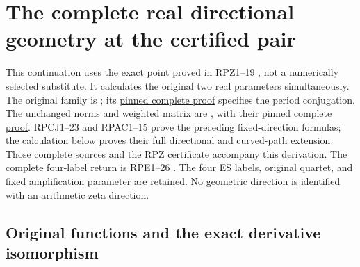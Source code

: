 \section{The complete real directional geometry at the certified pair}
\label{sec:real-pair-directional}

This continuation uses the exact point proved in RPZ1--19
\cite{RPZ005}, not a
numerically selected substitute.  It calculates the original two real
parameters simultaneously.  The original family is
\cite[PCL1--10]{PCLOriginal}; its
\href{https://github.com/KokunoYumeto/zeta-function-research-reader/blob/487253b5b01851da5b9b98af4e146fecf1fab902/workbenches/splitzero-tandem/continuations/20260919-native-conductor-coprimality/providers/PCL_COMPLETE.tex#L19}{pinned complete proof}
specifies the period conjugation.  The unchanged norms and weighted
matrix are \cite[WCF1--6]{WCF}, with their
\href{https://github.com/KokunoYumeto/zeta-function-research-reader/blob/5992ad50c0f2a06921f1fcaded7b4e38097c0739/workbenches/splitzero-tandem/continuations/20260920-original-kernel-mixed-determinants/providers/WEIGHTED_CONDUCTOR_FORWARD.tex#L28}{pinned complete proof}.
RPCJ1--23 and RPAC1--15 \cite{RPCJ005,RPAC005} prove the preceding fixed-direction formulas;
the calculation below proves their full directional and curved-path
extension.  Those complete sources and the RPZ certificate accompany
this derivation.  The complete four-label return is RPE1--26 \cite{RPE005}.
The four ES labels, original quartet, and fixed
amplification parameter are retained.  No geometric direction is
identified with an arithmetic zeta direction.

\subsection{Original functions and the exact derivative isomorphism}

